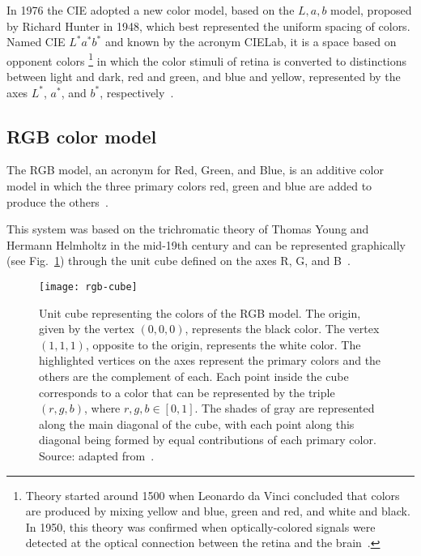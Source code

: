 In 1976 the CIE adopted a new color model, based on the $L, a, b$ model, proposed by Richard Hunter in 1948, which best represented the uniform spacing of colors. Named CIE $L^*a^*b^*$ and known by the acronym CIELab, it is a space based on opponent colors \footnote{Theory started around 1500 when Leonardo da Vinci concluded that colors are produced by mixing yellow and blue, green and red, and white and black. In 1950, this theory was confirmed when optically-colored signals were detected at the optical connection between the retina and the brain~\citep{gevers:12}.} in which the color stimuli of retina is converted to distinctions between light and dark, red and green, and blue and yellow, represented by the axes $L^*$, $a^*$, and $b^*$, respectively~\citep{gevers:12}.


\subsection{RGB color model}
\label{sec:modelo_cores_rgb}

The RGB model, an acronym for Red, Green, and Blue, is an additive color model in which the three primary colors red, green and blue are added to produce the others~\citep{gonzalez:02}.

This system was based on the trichromatic theory of Thomas Young and Hermann Helmholtz in the mid-19th century and can be represented graphically (see Fig.~\ref{fig:rgb-cube}) through the unit cube defined on the axes R, G, and B~\citep{konstantinos:00}.

\begin{figure}[!ht]
  \centering
  \texttt{[image: rgb-cube]}
  \caption[Unit cube representing the colors of the RGB model]{Unit cube representing the colors of the RGB model. The origin, given by the vertex $(0, 0, 0)$, represents the black color. The vertex $(1, 1, 1)$, opposite to the origin, represents the white color. The highlighted vertices on the axes represent the primary colors and the others are the complement of each. Each point inside the cube corresponds to a color that can be represented by the triple $(r, g, b)$, where $r, g, b \in [0, 1]$. The shades of gray are represented along the main diagonal of the cube, with each point along this diagonal being formed by equal contributions of each primary color. Source: adapted from~\citet{gonzalez:02}.}
  \label{fig:rgb-cube} 
\end{figure}


